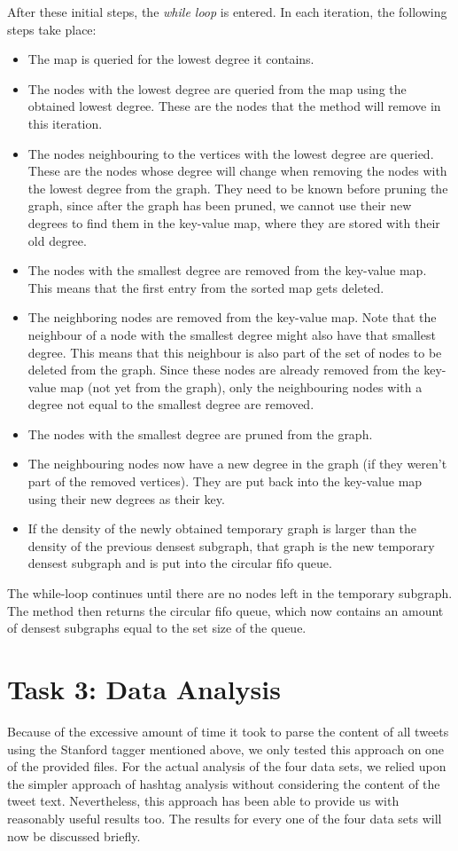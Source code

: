 \documentclass[10pt,a4paper]{article}
\begin{document}
After these initial steps, the \emph{while loop} is entered. In each iteration, the following steps take place:
\begin{itemize}
\item The map is queried for the lowest degree it contains.
\item The nodes with the lowest degree are queried from the map using the obtained lowest degree. These are the nodes that the method will remove in this iteration.
\item The nodes neighbouring to the vertices with the lowest degree are queried. These are the nodes whose degree will change when removing the nodes with the lowest degree from the graph. They need to be known before pruning the graph, since after the graph has been pruned, we cannot use their new degrees to find them in the key-value map, where they are stored with their old degree.
\item The nodes with the smallest degree are removed from the key-value map. This means that the first entry from the sorted map gets deleted.
\item The neighboring nodes are removed from the key-value map. Note that the neighbour of a node with the smallest degree might also have that smallest degree. This means that this neighbour is also part of the set of nodes to be deleted from the graph. Since these nodes are already removed from the key-value map (not yet from the graph), only the neighbouring nodes with a degree not equal to the smallest degree are removed.
\item The nodes with the smallest degree are pruned from the graph.
\item The neighbouring nodes now have a new degree in the graph (if they weren't part of the removed vertices). They are put back into the key-value map using their new degrees as their key.
\item If the density of the newly obtained temporary graph is larger than the density of the previous densest subgraph, that graph is the new temporary densest subgraph and is put into the circular fifo queue.
\end{itemize}
The while-loop continues until there are no nodes left in the temporary subgraph. The method then returns the circular fifo queue, which now contains an amount of densest subgraphs equal to the set size of the queue.


\section{Task 3: Data Analysis}
Because of the excessive amount of time it took to parse the content of all tweets using the Stanford tagger mentioned above, we only tested this approach on one of the provided files. For the actual analysis of the four data sets, we relied upon the simpler approach of hashtag analysis without considering the content of the tweet text. Nevertheless, this approach has been able to provide us with reasonably useful results too. The results for every one of the four data sets will now be discussed briefly.
\end{document}
